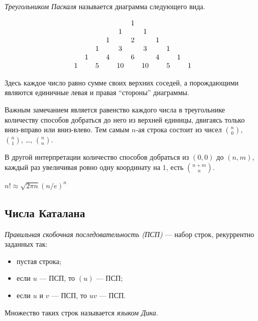 \documentclass[12pt,a4paper]{article}
\begin{document}
    \begin{definition}
        \emph{Треугольником Паскаля} называется диаграмма следующего вида.

        \[
            \setcounter{MaxMatrixCols}{15}
            \begin{matrix}
                &&&&& 1\\
                &&&& 1 && 1\\
                &&& 1 && 2 && 1\\
                && 1 && 3 && 3 && 1\\
                & 1 && 4 && 6 && 4 && 1\\
                1 && 5 && 10 && 10 && 5 && 1\\
            \end{matrix}
        \]

        Здесь каждое число равно сумме своих верхних соседей, а порождающими являются единичные левая и правая ``стороны'' диаграммы.
    \end{definition}

    Важным замечанием является равенство каждого числа в треугольнике количеству способов добраться до него из верхней единицы, двигаясь только вниз-вправо или вниз-влево. Тем самым $n$-ая строка состоит из чисел $\binom{n}{0}$, $\binom{n}{1}$, \dots, $\binom{n}{n}$.

    В другой интерпретации количество способов добраться из $(0, 0)$ до $(n, m)$, каждый раз увеличивая ровно одну координату на $1$, есть $\binom{n+m}{n}$.
    
    \begin{theorem}
        $n! \approx \sqrt{2\pi n}(n/e)^n$
    \end{theorem}

    \subsection{Числа Каталана}

    \begin{definition}
        \emph{Правильная скобочная последовательность (ПСП)} --- набор строк, рекуррентно заданных так:
        \begin{itemize}
            \item пустая строка;
            \item если $u$ --- ПСП, то $(u)$ --- ПСП;
            \item если $u$ и $v$ --- ПСП, то $uv$ --- ПСП.
        \end{itemize}

        Множество таких строк называется \emph{языком Дика}.
    \end{definition}
\end{document}
